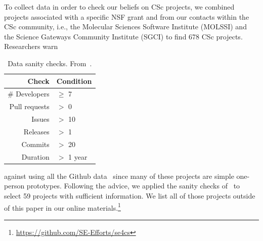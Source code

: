 \documentclass[conference,10pt]{IEEEtran}
\begin{document}
 

 
 

 

To collect data in order to check our beliefs on CSc projects, we combined projects associated with a specific NSF grant and from our contacts within the CSc community, i.e., the Molecular Sciences Software Institute (MOLSSI) and the Science Gateways Community Institute (SGCI) to find
678 CSc projects. Researchers
warn  \begin{table}
\vspace{-15pt}
\centering
\caption{Data sanity checks. From~\cite{Kalliamvakou:2014}.}\label{tbl:sanity}
\small
\begin{tabular}{r|l}
 Check   & Condition    \\\hline
 \# Developers & $\geq$ 7 \\
 Pull requests  & $>$ 0 \\
Issues & $>$ 10 \\
Releases &  $>$ 1 \\
Commits & $>$ 20 \\
Duration  & $>$ 1 year 
\end{tabular}%
\vspace{-10pt}
\end{table} against using all the Github data~\cite{bird09promise,agrawal2018we, eirini15promise, munaiah17curating} since
many of these projects are simple one-person prototypes. 
Following  the advice, we applied the sanity checks of~
to select 59 projects with sufficient information. We list all of those projects outside of this paper in our online materials.\footnote{\vspace{-20pt}\url{https://github.com/SE-Efforts/se4cs}}
\end{document}

